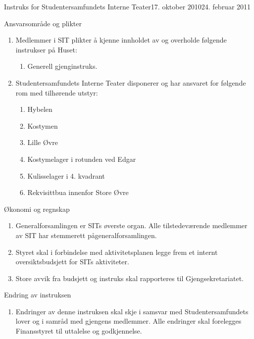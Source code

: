 \begin{instruks}{Instruks for Studentersamfundets Interne Teater}{17. oktober 2010}{24. februar 2011 }
	\begin{instruksledd}{Ansvarsområde og plikter}
		\begin{enumerate}   
			\item  Medlemmer i SIT plikter å kjenne innholdet av og overholde følgende instrukser på
				Huset:
				\begin{enumerate}
					\item Generell gjenginstruks.
				\end{enumerate}
			\item Studentersamfundets Interne Teater disponerer og har ansvaret for følgende rom med
				tilhørende utstyr:
				\begin{enumerate}
					\item Hybelen
					\item Kostymen
					\item Lille Øvre
					\item Kostymelager i rotunden ved Edgar
					\item Kulisselager i 4. kvadrant
					\item Rekvisittbua innenfor Store Øvre
				\end{enumerate}
		\end{enumerate}
	\end{instruksledd}

	\begin{instruksledd}{Økonomi og regnskap}
		\begin{enumerate}
			\item Generalforsamlingen er SITs øverste organ. Alle tilstedeværende
				medlemmer av SIT har stemmerett pågeneralforsamlingen. 
			\item Styret skal i forbindelse med aktivitetsplanen legge frem et
				internt oversiktsbudsjett for SITs aktiviteter.
			\item Store avvik fra budsjett og instruks skal rapporteres til
				Gjengsekretariatet.
		\end{enumerate}  
	\end{instruksledd}


	\begin{instruksledd}{Endring av instruksen}
		\begin{enumerate}
			\item Endringer av denne instruksen skal skje i samsvar med
				Studentersamfundets lover og i samråd med gjengens medlemmer. Alle endringer skal forelegges
				Finansstyret til uttalelse og godkjennelse.		
		\end{enumerate}  
	\end{instruksledd}


\end{instruks}
